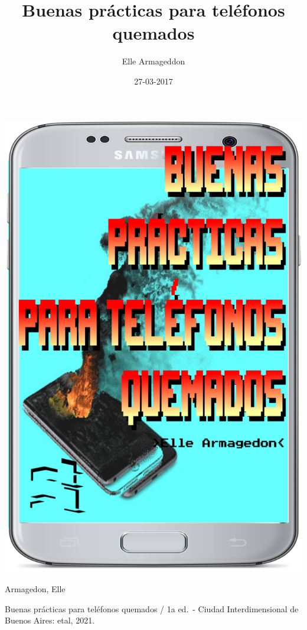 \documentclass[
]{book}
\title{Buenas prácticas para teléfonos quemados}
\author{Elle Armageddon}
\date{27-03-2017}
\begin{document}
\maketitle

{
\setcounter{tocdepth}{1}
\tableofcontents
}
\hypertarget{section}{%
\chapter*{}\label{section}}

\includegraphics{images/cover2.png}

Armagedon, Elle

Buenas prácticas para teléfonos quemados / 1a ed.~- Ciudad Interdimensional de
Buenos Aires: etal, 2021.
\end{document}
